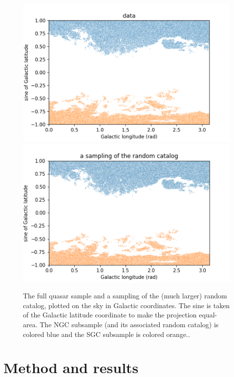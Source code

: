 \documentclass[modern]{aastex631}
\newlength{\figurewidth}
\begin{document}
\begin{figure}[t!]
  \begin{mdframed}
  \color{captiongray}
  \begin{center}
    \includegraphics[width=\figurewidth]{notebooks/lb.png}\\
    \includegraphics[width=\figurewidth]{notebooks/lb_random.png}
  \end{center}
    \caption{The full quasar sample and a sampling of the (much larger) random catalog, plotted on the sky in Galactic coordinates.
    The sine is taken of the Galactic latitude coordinate to make the projection equal-area.
    The NGC subsample (and its associated random catalog) is colored blue and the SGC subsample is colored orange.\label{fig:lb}.}
  \end{mdframed}
\end{figure}

\section{Method and results}
\end{document}

